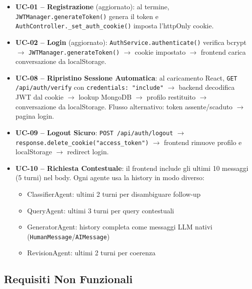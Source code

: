 \documentclass[a4paper,12pt]{report}
\begin{document}
\begin{itemize}
    \item \textbf{UC-01 -- Registrazione} (aggiornato): al termine, \texttt{JWTManager.generateToken()} genera il token e \texttt{AuthController.\_set\_auth\_cookie()} imposta l'httpOnly cookie.

    \item \textbf{UC-02 -- Login} (aggiornato): \texttt{AuthService.authenticate()} verifica bcrypt $\rightarrow$ \texttt{JWTManager.generateToken()} $\rightarrow$ cookie impostato $\rightarrow$ frontend carica conversazione da localStorage.

    \item \textbf{UC-08 -- Ripristino Sessione Automatica}: al caricamento React, \texttt{GET /api/auth/verify} con \texttt{credentials: "include"} $\rightarrow$ backend decodifica JWT dal cookie $\rightarrow$ lookup MongoDB $\rightarrow$ profilo restituito $\rightarrow$ conversazione da localStorage. Flusso alternativo: token assente/scaduto $\rightarrow$ pagina login.

    \item \textbf{UC-09 -- Logout Sicuro}: \texttt{POST /api/auth/logout} $\rightarrow$ \texttt{response.delete\_cookie("access\_token")} $\rightarrow$ frontend rimuove profilo e localStorage $\rightarrow$ redirect login.

    \item \textbf{UC-10 -- Richiesta Contestuale}: il frontend include gli ultimi 10 messaggi (5 turni) nel body. Ogni agente usa la history in modo diverso:
    \begin{itemize}
        \item ClassifierAgent: ultimi 2 turni per disambiguare follow-up
        \item QueryAgent: ultimi 3 turni per query contestuali
        \item GeneratorAgent: history completa come messaggi LLM nativi (\texttt{HumanMessage}/\texttt{AIMessage})
        \item RevisionAgent: ultimi 2 turni per coerenza
    \end{itemize}
\end{itemize}

\subsection{Requisiti Non Funzionali}
\end{document}
